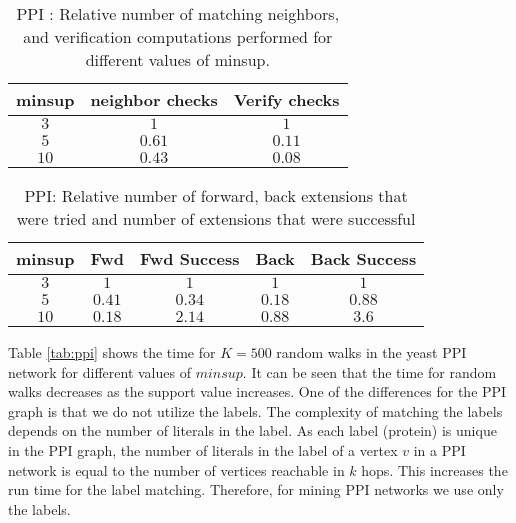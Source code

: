 \begin{table}[!h]
\centering
\begin{tabular}{|c|c|c|}
	\hline
	minsup & neighbor checks & Verify checks \\
	\hline
	$3$ & $1$ & $1$ \\ 
	$5$ & $0.61$ & $0.11$ \\
	$10$ & $0.43$ & $0.08$ \\
	\hline
	\end{tabular}
	\caption{PPI : Relative number of matching neighbors, and verification computations performed
	for different values of minsup.}
	\label{tab:ppi_relative}
	\end{table}

\begin{table}[!h]
    \centering
    \begin{tabular}{|c|c|c|c|c|}
        \hline
        minsup & Fwd & Fwd Success & Back & Back Success \\
        \hline
        $3$ & $1$ & $1$ & $1$ & $1$ \\
        $5$ & $0.41$ & $0.34$ & $0.18$ & $0.88$ \\ 
        $10$ & $0.18$ & $2.14$ & $0.88$ & $3.6$ \\
        \hline
    \end{tabular}
    \caption{PPI: Relative number of forward, back extensions that were
    tried and number of extensions that were successful}
    \label{tab:ppi_ext_relative}
\end{table}

\smallskip{} Table \ref{tab:ppi} shows the
time for $K=500$ random walks in the yeast PPI network for different
values of $minsup$.  It can be seen that the time for random walks
decreases as the support value increases.  One of the differences for
the PPI graph is that we do not utilize the \khop labels.  The
complexity of matching the \khop labels depends on the number of
literals in the \khop label.  As each label (protein) is unique in the
PPI graph, the number of literals in the \khop label of a vertex $v$ in
a PPI network is equal to the number of vertices reachable in $k$ hops.
This increases the run time for the \khop label matching.  Therefore,
for mining PPI networks we use only the \ncl labels.


